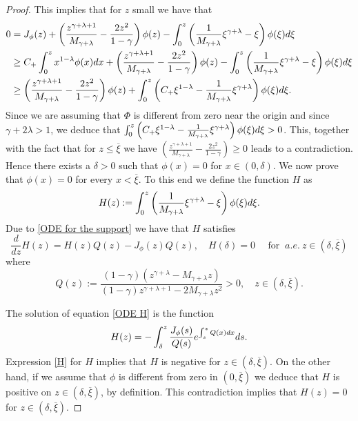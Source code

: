 \documentclass[11pt]{article}
\numberwithin{equation}{section}
\theoremstyle{plain}
\newcommand{\der}{\textup{d}}
\begin{document}
\begin{proof}
This implies that for $z$ small we have that
  \begin{align*}
0 & =J_\phi(z) + \left( \frac{z^{\gamma + \lambda +1} }{M_{\gamma + \lambda} }- \frac{2 z^2 }{1-\gamma }\right) \phi(z) - \int_0^z  \left( \frac{1}{M_{\gamma +\lambda} } \xi^{\gamma + \lambda} - \xi \right) \phi(\xi) \der \xi \\
& \geq   C_+ \int_0^z x^{1-\lambda} \phi( x) \der x+ \left( \frac{z^{\gamma + \lambda +1} }{M_{\gamma + \lambda} }- \frac{2 z^2 }{1-\gamma }\right) \phi(z) - \int_0^z  \left( \frac{1}{M_{\gamma +\lambda} } \xi^{\gamma + \lambda} - \xi \right) \phi(\xi) \der \xi \\
& \geq \left( \frac{z^{\gamma + \lambda +1} }{M_{\gamma + \lambda} }- \frac{2 z^2 }{1-\gamma }\right) \phi(z) + \int_0^z  \left(  C_+ \xi^{1-\lambda} - \frac{1}{M_{\gamma +\lambda} } \xi^{\gamma + \lambda} \right)  \phi(\xi) \der \xi.
  \end{align*} 
Since we are assuming that $\Phi $ is different from zero near the origin and since $\gamma+2\lambda>1$, we deduce that
$\int_0^z  \left(  C_+ \xi^{1-\lambda} - \frac{1}{M_{\gamma +\lambda} } \xi^{\gamma + \lambda} \right)  \phi(\xi) \der \xi>0$. 
This, together with the fact that for $z \leq \overline \xi$ we have $\left( \frac{z^{\gamma + \lambda +1} }{M_{\gamma + \lambda} }- \frac{2 z^2 }{1-\gamma }\right) \geq 0$ leads to a contradiction. Hence there exists a $\delta>0$ such that $\phi(x)=0$ for $x \in (0, \delta)$. 
We now prove that $\phi(x)=0$ for every $x < \overline \xi$. 
To this end we define the function $H$ as 
\[
H(z):= \int_0^z  \left( \frac{1}{M_{\gamma +\lambda} } \xi^{\gamma + \lambda} - \xi \right) \phi(\xi) \der \xi.
\] 
Due to \eqref{ODE for the support} we have that $H$ satisfies 
\begin{equation} \label{ODE H} 
\frac{d}{dz} H(z)= H(z)Q(z)-J_\phi(z)Q(z) , \quad H(\delta)=0 \quad \text{ for }  \ a.e. \ z\in (\delta, \overline \xi) 
\end{equation}
where 
\begin{equation}\label{def of Q} 
Q(z):=\frac{(1-\gamma ) ( z^{\gamma + \lambda} - M_{\gamma + \lambda}z) }{(1-\gamma ) z^{\gamma + \lambda+1} - 2 M_{\gamma + \lambda } z^2} > 0, \quad   z  \in (\delta ,\overline \xi). 
\end{equation}

The solution of equation \eqref{ODE H} is the function
\begin{equation} \label{H}
H(z)= - \int_\delta^z \frac{J_\phi(s) }{Q(s)} e^{ \int_s^z Q(x) \der x } \der s. 
\end{equation}
 Expression \eqref{H} for $H$ implies that $H$ is negative for $z \in (\delta, \overline \xi)$.
 On the other hand, if we assume that $\phi$ is different from zero in $(0, \overline \xi)$ we deduce that $H$ is positive on $z \in (\delta, \overline \xi)$, by definition. This contradiction implies that $H(z)=0$ for $z \in (\delta,\overline \xi).$
\end{proof}
	
\end{document}
